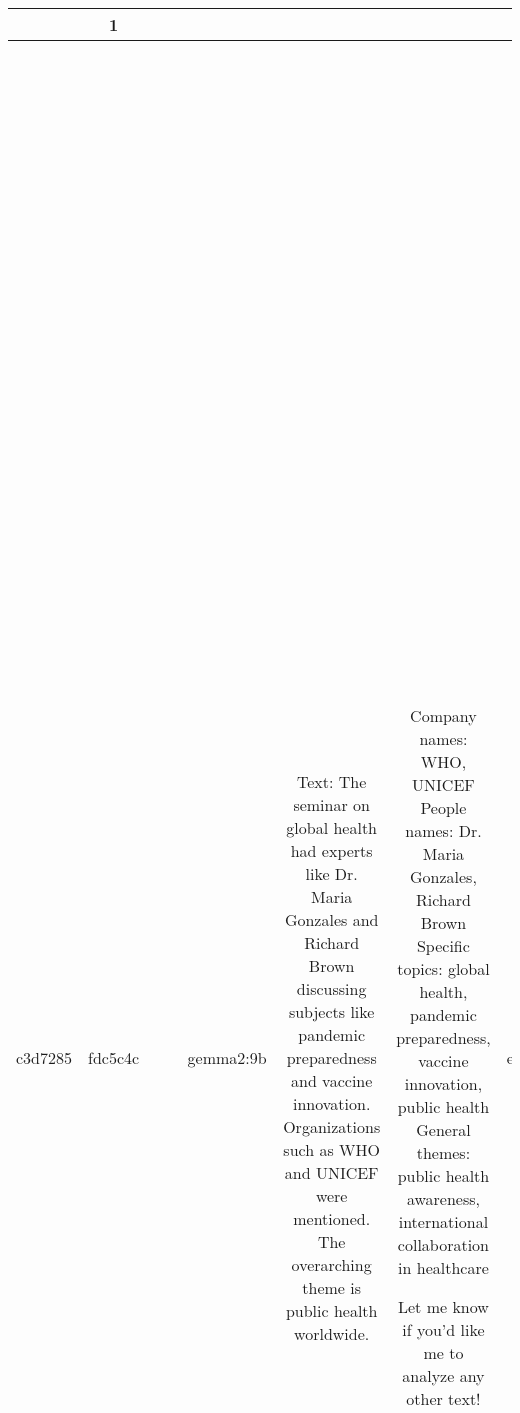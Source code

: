 \begin{table}[h!]
\begin{tabular}{|c|c|c|c|c|c|c|c|c|c|}
{The presence of an extra comma at the end of the people names list slightly deviates from the required format, which is a comma-separated list. This constitutes a minor format violation. 

ERR & 1\\
\hline
c3d7285 & fdc5c4c &  &  & gemma2:9b & Text: The seminar on global health had experts like Dr. Maria Gonzales and Richard Brown discussing subjects like pandemic preparedness and vaccine innovation. Organizations such as WHO and UNICEF were mentioned. The overarching theme is public health worldwide. & Company names: WHO, UNICEF 
People names: Dr. Maria Gonzales, Richard Brown
Specific topics: global health, pandemic preparedness, vaccine innovation, public health
General themes:  public health awareness, international collaboration in healthcare 


Let me know if you'd like me to analyze any other text! & err & The chatbot output partially complies with the description:

1. The output correctly follows the desired format by listing "Company names," "People names," "Specific topics," and "General themes" followed by a colon and a comma-separated list of items. However, the presence of "WHO" (a global health organization) and "UNICEF" (a United Nations program) as "Company names" might be considered debatable since they are not traditional companies, although this determination requires knowledge of the input text. 

2. Importantly, the output includes an additional sentence not requested in the format: "Let me know if you'd like me to analyze any other text!". This is not part of the specified format in the chatbot description and violates the rule of maintaining the exact format.

Given the above evaluation, the presence of unsolicited additional text leads to non-compliance with the description.

ERR & 1\\
\hline
dce2eae & fdc5c4c &  &  & llama3.2:1b & Text: The financial summit featured top executives from Goldman Sachs, JP Morgan, and Wells Fargo. Discussions by Mary Johnson and Alex Li centered around topics such as economic forecasts and market regulations. The overall theme is global finance. & **Company Names:** Goldman Sachs, JP Morgan, Wells Fargo

**People Names:** 
- Mary Johnson
- Alex Li

**Specific Topics:** 
- Economic Forecasts
- Market Regulations
- Global Finance

}
\end{tabular}
\end{table}
